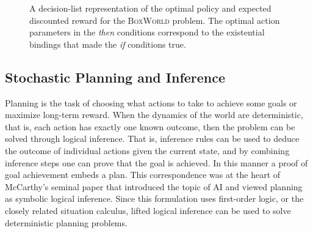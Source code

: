%
%
%
%
%
%
%
%
%
%
%
%
%

%
%
%
%
%
%

%
%
%
%
%

%
%
\begin{figure}[t!]
\caption{A decision-list representation of the optimal policy and 
  expected discounted reward for the \textsc{BoxWorld} problem.
  The optimal action parameters in the \emph{then} conditions correspond to the existential
  bindings that made the \emph{if} conditions true.
  \label{fig:vfun_and_policy}
}
\vspace{2mm}
\begin{center}
\end{center}\end{figure}
%

\subsection{Stochastic Planning and Inference}

%
%
%
%
%
%

Planning is the task of choosing what actions to take to achieve some
goals or maximize long-term reward.  When the dynamics of the world are 
deterministic, that is, each action has exactly one known outcome,
then the problem can be solved through logical inference. That is,
inference rules can be used to deduce the outcome of individual actions given the
current state, and by combining inference steps one can prove that the
goal is achieved. In this manner a proof of goal achievement embeds a
plan. This correspondence was at the heart of McCarthy's
seminal paper \cite{McCarthy58} that introduced the topic of AI and viewed
planning as symbolic logical inference.  Since this formulation uses
first-order logic, or the closely related situation calculus, lifted
logical inference can be used to solve deterministic planning
problems.

